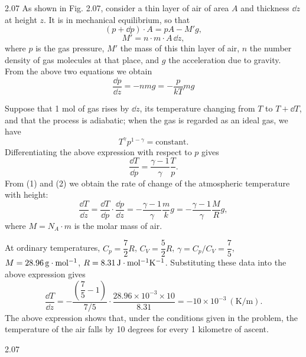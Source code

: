 \begin{solution}{2.07}
As shown in Fig. 2.07, consider a thin layer of air of area $A$ and thickness $\dd z$ at height $z$. It is in mechanical equilibrium, so that
\[
(p+\dd p)\cdot A=pA-M'g,
\]
\[
M'=n\cdot m\cdot A\,\dd z,
\]
where $p$ is the gas pressure, $M'$ the mass of this thin layer of air, $n$ the number density of gas molecules at that place, and $g$ the acceleration due to gravity. From the above two equations we obtain
\begin{equation}
\frac{\dd p}{\dd z}=-nmg=-\frac{p}{kT}mg \tag{1}
\end{equation}

Suppose that 1 mol of gas rises by $\dd z$, its temperature changing from $T$ to $T+\dd T$, and that the process is adiabatic; when the gas is regarded as an ideal gas, we have
\[
T^{\gamma}p^{1-\gamma}=\text{constant}.
\]
Differentiating the above expression with respect to $p$ gives
\begin{equation}
\frac{\dd T}{\dd p}=\frac{\gamma-1}{\gamma}\frac{T}{p}. \tag{2}
\end{equation}
From (1) and (2) we obtain the rate of change of the atmospheric temperature with height:
\[
\frac{\dd T}{\dd z}=\frac{\dd T}{\dd p}\cdot\frac{\dd p}{\dd z}
=-\frac{\gamma-1}{\gamma}\frac{m}{k}g
=-\frac{\gamma-1}{\gamma}\frac{M}{R}g,
\]
where $M=N_A\cdot m$ is the molar mass of air.

At ordinary temperatures, $C_p=\dfrac{7}{2}R$, $C_V=\dfrac{5}{2}R$, $\gamma=C_p/C_V=\dfrac{7}{5}$, $M=28.96\,\mathrm{g\cdot mol^{-1}}$, $R=8.31\,\mathrm{J\cdot mol^{-1}K^{-1}}$. Substituting these data into the above expression gives
\[
\frac{\dd T}{\dd z}
=-\frac{\left(\dfrac{7}{5}-1\right)}{7/5}\cdot\frac{28.96\times10^{-3}\times10}{8.31}
=-10\times10^{-3}\ (\text{K/m}).
\]
The above expression shows that, under the conditions given in the problem, the temperature of the air falls by 10 degrees for every 1 kilometre of ascent.

\begin{figbox}{2.07}
\end{figbox}

\end{solution}

